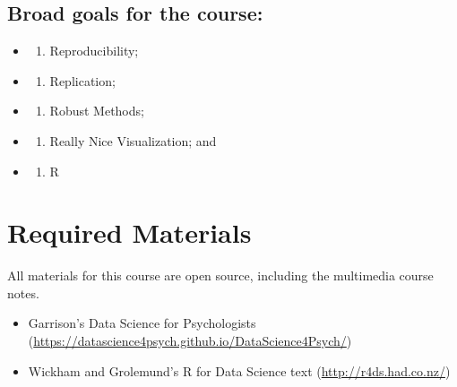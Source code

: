 \documentclass[
]{book}
\providecommand{\tightlist}{%
  \setlength{\itemsep}{0pt}\setlength{\parskip}{0pt}}
\begin{document}
\subsection*{Broad goals for the course:}\label{broad-goals-for-the-course-2}


\begin{itemize}
\tightlist
\item
  \begin{enumerate}
  \def\labelenumi{\arabic{enumi}.}
  \tightlist
  \item
    Reproducibility;
  \end{enumerate}
\item
  \begin{enumerate}
  \def\labelenumi{\arabic{enumi}.}
  \setcounter{enumi}{1}
  \tightlist
  \item
    Replication;
  \end{enumerate}
\item
  \begin{enumerate}
  \def\labelenumi{\arabic{enumi}.}
  \setcounter{enumi}{2}
  \tightlist
  \item
    Robust Methods;
  \end{enumerate}
\item
  \begin{enumerate}
  \def\labelenumi{\arabic{enumi}.}
  \setcounter{enumi}{3}
  \tightlist
  \item
    Really Nice Visualization; and
  \end{enumerate}
\item
  \begin{enumerate}
  \def\labelenumi{\arabic{enumi}.}
  \setcounter{enumi}{4}
  \tightlist
  \item
    R
  \end{enumerate}
\end{itemize}

\section*{Required Materials}\label{required-materials-4}


All materials for this course are open source, including the multimedia course notes.

\begin{itemize}
\tightlist
\item
  Garrison's Data Science for Psychologists (\url{https://datascience4psych.github.io/DataScience4Psych/})
\item
  Wickham and Grolemund's R for Data Science text (\url{http://r4ds.had.co.nz/})
\end{itemize}
\end{document}
